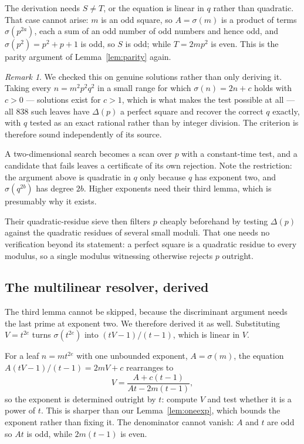 \documentclass[11pt]{amsart}
\theoremstyle{remark}
\newtheorem{remark}[theorem]{Remark}
\begin{document}
The derivation needs $S \ne T$, or the equation is linear in $q$ rather than
quadratic. That case cannot arise: $m$ is an odd square, so $A = \sigma(m)$ is a
product of terms $\sigma(p^{2a})$, each a sum of an odd number of odd numbers and
hence odd, and $\sigma(p^{2}) = p^{2}+p+1$ is odd, so $S$ is odd; while
$T = 2mp^{2}$ is even. This is the parity argument of Lemma~\ref{lem:parity}
again.

\begin{remark}
We checked this on genuine solutions rather than only deriving it. Taking every
$n = m^{2}p^{2}q^{2}$ in a small range for which $\sigma(n) = 2n + c$ holds with
$c > 0$ --- solutions exist for $c > 1$, which is what makes the test possible at
all --- all $838$ such leaves have $\Delta(p)$ a perfect square and recover the
correct $q$ exactly, with $q$ tested as an exact rational rather than by integer
division. The criterion is therefore sound independently of its source.
\end{remark}

A two-dimensional search becomes a scan over $p$ with a constant-time test, and a
candidate that fails leaves a certificate of its own rejection. Note the
restriction: the argument above is quadratic in $q$ only because $q$ has exponent
two, and $\sigma(q^{2b})$ has degree $2b$. Higher exponents need their third
lemma, which is presumably why it exists.

Their quadratic-residue sieve then filters $p$ cheaply beforehand by testing
$\Delta(p)$ against the quadratic residues of several small moduli. That one needs
no verification beyond its statement: a perfect square is a quadratic residue to
every modulus, so a single modulus witnessing otherwise rejects $p$ outright.
\subsection{The multilinear resolver, derived}\label{sec:resolver}
The third lemma cannot be skipped, because the discriminant argument needs the
last prime at exponent two. We therefore derived it as well. Substituting
$V = t^{2e}$ turns $\sigma(t^{2e})$ into $(tV-1)/(t-1)$, which is linear in $V$.

For a leaf $n = m t^{2e}$ with one unbounded exponent, $A = \sigma(m)$, the
equation $A(tV-1)/(t-1) = 2mV + c$ rearranges to
\[
  V = \frac{A + c(t-1)}{At - 2m(t-1)} ,
\]
so the exponent is determined outright by $t$: compute $V$ and test whether it is
a power of $t$. This is sharper than our Lemma~\ref{lem:oneexp}, which bounds the
exponent rather than fixing it. The denominator cannot vanish: $A$ and $t$ are odd
so $At$ is odd, while $2m(t-1)$ is even.
\end{document}
